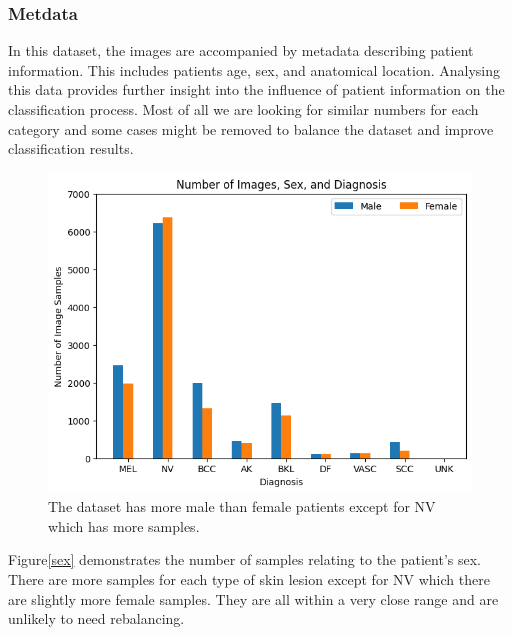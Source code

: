 \subsubsection{Metdata}
In this dataset, the images are accompanied by metadata describing patient information. This includes patients age, sex, and anatomical location. Analysing this data provides further insight into the influence of patient information on the classification process. Most of all we are looking for similar numbers for each category and some cases might be removed to balance the dataset and improve classification results.

\begin{figure}
    \centering
    \includegraphics[scale=0.75]{images/ISIC/number-sex-diagnosis.png}
    \caption{The dataset has more male than female patients except for NV which has more samples.} 
\end{figure} \label{sex}

Figure\ref{sex} demonstrates the number of samples relating to the patient's sex. There are more samples for each type of skin lesion except for NV which there are slightly more female samples. They are all within a very close range and are unlikely to need rebalancing.

